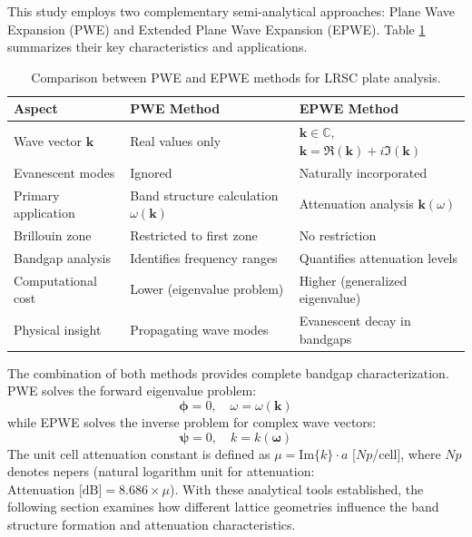 \documentclass[review,numbers,sort&compress]{elsarticle}
\begin{document}
This study employs two complementary semi-analytical approaches: Plane Wave Expansion (PWE) and Extended Plane Wave Expansion (EPWE). Table \ref{pwe_epwe_comparison} summarizes their key characteristics and applications.
\newpage
\begin{table}[htb]
\centering
\small
\caption{Comparison between PWE and EPWE methods for LRSC plate analysis.}
\label{pwe_epwe_comparison}
\begin{tabular}{p{2.2cm}p{3.8cm}p{3.8cm}}
\hline
Aspect & PWE Method & EPWE Method \\
\hline
Wave vector $\mathbf{k}$ & Real values only & $\mathbf{k} \in \mathbb{C}$, $\mathbf{k} = \Re(\mathbf{k}) + i\Im(\mathbf{k})$ \\
\hline
Evanescent modes & Ignored & Naturally incorporated \\
\hline
Primary application & Band structure calculation $\omega(\mathbf{k})$ & Attenuation analysis $\mathbf{k}(\omega)$ \\
\hline
Brillouin zone & Restricted to first zone & No restriction \\
\hline
Bandgap analysis & Identifies frequency ranges & Quantifies attenuation levels \\
\hline
Computational cost & Lower (eigenvalue problem) & Higher (generalized eigenvalue) \\
\hline
Physical insight & Propagating wave modes & Evanescent decay in bandgaps \\
\hline
\end{tabular}
\end{table}

The combination of both methods provides complete bandgap characterization. PWE solves the forward eigenvalue problem:
\begin{equation}
[\mathbf{K} - \omega^2\mathbf{M}]\boldsymbol{\phi} = 0, \quad \omega = \omega(\mathbf{k})
\label{eq:pwe_forward}
\end{equation}
while EPWE solves the inverse problem for complex wave vectors:
\begin{equation}
[\mathbf{A}_3 k^3 + \mathbf{A}_2 k^2 + \mathbf{A}_1 k + \mathbf{A}_0]\boldsymbol{\psi} = 0, \quad k = k(\boldsymbol{\omega})
\label{eq:epwe_inverse}
\end{equation}
The unit cell attenuation constant is defined as $\mu = \text{Im}\{k\} \cdot a$ [$Np$/cell], where $Np$ denotes nepers (natural logarithm unit for attenuation: $\text{Attenuation [dB]} = 8.686 \times \mu$). With these analytical tools established, the following section examines how different lattice geometries influence the band structure formation and attenuation characteristics.
\end{document}
